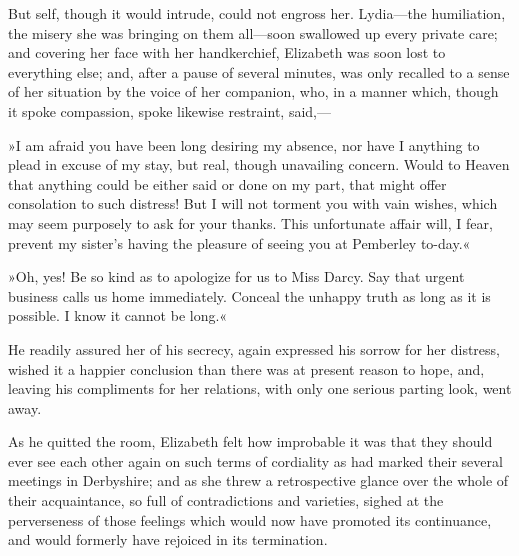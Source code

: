 But self, though it would intrude, could not engross her. Lydia—the humiliation, the misery she was bringing on them all—soon swallowed up every private care; and covering her face with her handkerchief, Elizabeth was soon lost to everything else; and, after a pause of several minutes, was only recalled to a sense of her situation by the voice of her companion, who, in a manner which, though it spoke compassion, spoke likewise restraint, said,—

»I am afraid you have been long desiring my absence, nor have I anything to plead in excuse of my stay, but real, though unavailing concern. Would to Heaven that anything could be either said or done on my part, that might offer consolation to such distress! But I will not torment you with vain wishes, which may seem purposely to ask for your thanks. This unfortunate affair will, I fear, prevent my sister's having the pleasure of seeing you at Pemberley to-day.«

»Oh, yes! Be so kind as to apologize for us to Miss Darcy. Say that urgent business calls us home immediately. Conceal the unhappy truth as long as it is possible. I know it cannot be long.«

He readily assured her of his secrecy, again expressed his sorrow for her distress, wished it a happier conclusion than there was at present reason to hope, and, leaving his compliments for her relations, with only one serious parting look, went away.

As he quitted the room, Elizabeth felt how improbable it was that they should ever see each other again on such terms of cordiality as had marked their several meetings in Derbyshire; and as she threw a retrospective glance over the whole of their acquaintance, so full of contradictions and varieties, sighed at the perverseness of those feelings which would now have promoted its continuance, and would formerly have rejoiced in its termination.

